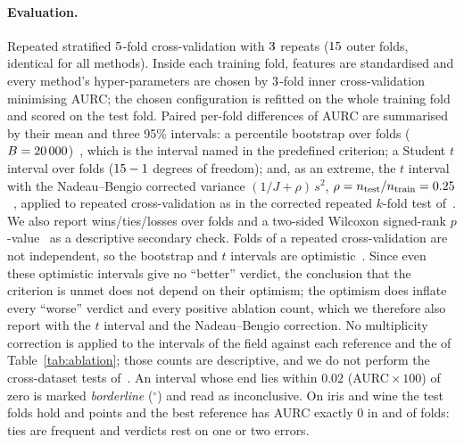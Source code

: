 \documentclass[10pt,a4paper]{article}
\theoremstyle{plain}
\theoremstyle{definition}
\theoremstyle{remark}
\begin{document}
\begin{table}[t]
\centering\footnotesize

\caption{Datasets. $d$ is the dimension after preprocessing; the Bayes error is known only for the Gaussian problems.}
\label{tab:datasets}
\end{table}

\paragraph{Evaluation.} Repeated stratified $5$-fold cross-validation with $3$ repeats ($15$ outer folds, identical for all methods). Inside each training fold, features are standardised and every method's hyper-parameters are chosen by $3$-fold inner cross-validation minimising AURC; the chosen configuration is refitted on the whole training fold and scored on the test fold. Paired per-fold differences of AURC are summarised by their mean and three 95\% intervals: a percentile bootstrap over folds ($B=20\,000$)~\citep{efron1993}, which is the interval named in the predefined criterion; a Student $t$ interval over folds ($15-1$ degrees of freedom); and, as an extreme, the $t$ interval with the Nadeau--Bengio corrected variance $(1/J+\rho)\,s^2$, $\rho=n_{\mathrm{test}}/n_{\mathrm{train}}=0.25$~\citep{nadeau2003}, applied to repeated cross-validation as in the corrected repeated $k$-fold test of~\citet{bouckaert2004}. We also report wins/ties/losses over folds and a two-sided Wilcoxon signed-rank $p$-value~\citep{wilcoxon1945} as a descriptive secondary check. Folds of a repeated cross-validation are not independent, so the bootstrap and $t$ intervals are optimistic~\citep{dietterich1998,nadeau2003}. Since even these optimistic intervals give no ``better'' verdict, the conclusion that the criterion is unmet does not depend on their optimism; the optimism does inflate every ``worse'' verdict and every positive ablation count, which we therefore also report with the $t$ interval and the Nadeau--Bengio correction. No multiplicity correction is applied to the \NVsRefCells{} intervals of the field against each reference and the \NAblCells{} of Table~\ref{tab:ablation}; those counts are descriptive, and we do not perform the cross-dataset tests of~\citet{demsar2006}. An interval whose end lies within $0.02$ (AURC${}\times100$) of zero is marked \emph{borderline} ($^{\circ}$) and read as inconclusive. On iris and wine the test folds hold \TestSizeIris{} and \TestSizeWine{} points and the best reference has AURC exactly $0$ in \ZeroFoldsIris{} and \ZeroFoldsWine{} of \MetaFolds{} folds: ties are frequent and verdicts rest on one or two errors.
\end{document}
